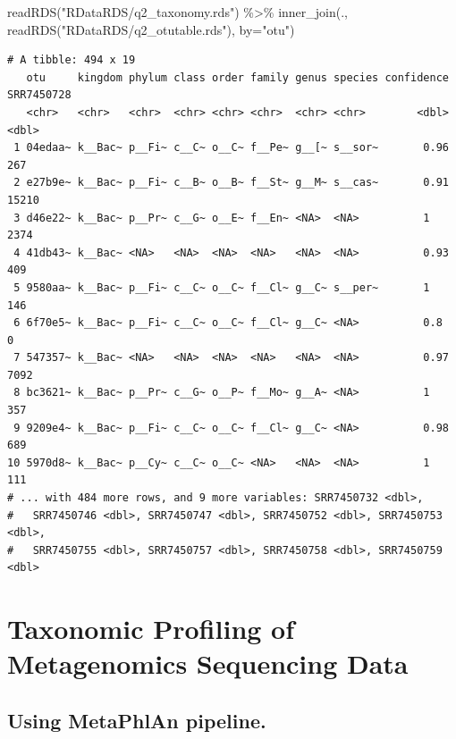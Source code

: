 \documentclass[
  12pt,
  openany]{book}
\newenvironment{Shaded}{\begin{snugshade}}{\end{snugshade}}
\newcommand{\AttributeTok}[1]{\textcolor[rgb]{0.77,0.63,0.00}{#1}}
\newcommand{\FunctionTok}[1]{\textcolor[rgb]{0.00,0.00,0.00}{#1}}
\newcommand{\NormalTok}[1]{#1}
\newcommand{\SpecialCharTok}[1]{\textcolor[rgb]{0.00,0.00,0.00}{#1}}
\newcommand{\StringTok}[1]{\textcolor[rgb]{0.31,0.60,0.02}{#1}}
\begin{document}
\begin{Shaded}
\begin{Highlighting}[]
\FunctionTok{readRDS}\NormalTok{(}\StringTok{"RDataRDS/q2\_taxonomy.rds"}\NormalTok{) }\SpecialCharTok{\%\textgreater{}\%} 
  \FunctionTok{inner\_join}\NormalTok{(., }\FunctionTok{readRDS}\NormalTok{(}\StringTok{"RDataRDS/q2\_otutable.rds"}\NormalTok{), }\AttributeTok{by=}\StringTok{"otu"}\NormalTok{)}
\end{Highlighting}
\end{Shaded}

\begin{verbatim}
# A tibble: 494 x 19
   otu     kingdom phylum class order family genus species confidence SRR7450728
   <chr>   <chr>   <chr>  <chr> <chr> <chr>  <chr> <chr>        <dbl>      <dbl>
 1 04edaa~ k__Bac~ p__Fi~ c__C~ o__C~ f__Pe~ g__[~ s__sor~       0.96        267
 2 e27b9e~ k__Bac~ p__Fi~ c__B~ o__B~ f__St~ g__M~ s__cas~       0.91      15210
 3 d46e22~ k__Bac~ p__Pr~ c__G~ o__E~ f__En~ <NA>  <NA>          1          2374
 4 41db43~ k__Bac~ <NA>   <NA>  <NA>  <NA>   <NA>  <NA>          0.93        409
 5 9580aa~ k__Bac~ p__Fi~ c__C~ o__C~ f__Cl~ g__C~ s__per~       1           146
 6 6f70e5~ k__Bac~ p__Fi~ c__C~ o__C~ f__Cl~ g__C~ <NA>          0.8           0
 7 547357~ k__Bac~ <NA>   <NA>  <NA>  <NA>   <NA>  <NA>          0.97       7092
 8 bc3621~ k__Bac~ p__Pr~ c__G~ o__P~ f__Mo~ g__A~ <NA>          1           357
 9 9209e4~ k__Bac~ p__Fi~ c__C~ o__C~ f__Cl~ g__C~ <NA>          0.98        689
10 5970d8~ k__Bac~ p__Cy~ c__C~ o__C~ <NA>   <NA>  <NA>          1           111
# ... with 484 more rows, and 9 more variables: SRR7450732 <dbl>,
#   SRR7450746 <dbl>, SRR7450747 <dbl>, SRR7450752 <dbl>, SRR7450753 <dbl>,
#   SRR7450755 <dbl>, SRR7450757 <dbl>, SRR7450758 <dbl>, SRR7450759 <dbl>
\end{verbatim}

\hypertarget{taxonomic-profiling-of-metagenomics-sequencing-data}{%
\chapter{Taxonomic Profiling of Metagenomics Sequencing Data}\label{taxonomic-profiling-of-metagenomics-sequencing-data}}

\hypertarget{using-metaphlan-pipeline.}{%
\section{Using MetaPhlAn pipeline.}\label{using-metaphlan-pipeline.}}
\end{document}
